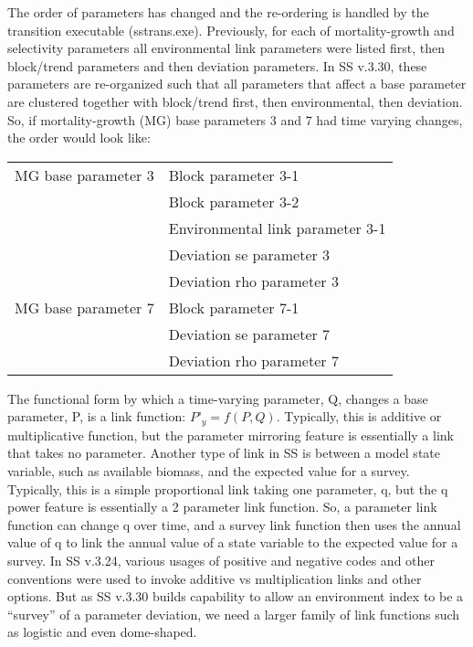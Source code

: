 The order of parameters has changed and the re-ordering is handled by the transition executable (sstrans.exe).  Previously, for each of mortality-growth and selectivity parameters all environmental link parameters were listed first, then block/trend parameters and then deviation parameters.  In SS v.3.30, these parameters are re-organized such that all parameters that affect a base parameter are clustered together with block/trend first, then environmental, then deviation.  So, if mortality-growth (MG) base parameters 3 and 7 had time varying changes, the order would look like:

\begin{center}
	\begin{longtable}{p{5cm} p{10cm}}
		\hline
		MG base parameter 3 & Block parameter 3-1\Tstrut\\
		& Block parameter 3-2\\
		& Environmental link parameter 3-1\\
		& Deviation se parameter 3 \\
		& Deviation rho parameter 3 \Bstrut\\
		MG base parameter 7 & Block parameter 7-1 \\
		& Deviation se parameter 7 \\
		& Deviation rho parameter 7 \Bstrut\\
		\hline	 	                    
		
	\end{longtable}
\end{center}

The functional form by which a time-varying parameter, Q, changes a base parameter, P, is a link function:  $P’_y=f(P,Q)$. Typically, this is additive or multiplicative function, but the parameter mirroring feature is essentially a link that takes no parameter. Another type of link in SS is between a model state variable, such as available biomass, and the expected value for a survey.  Typically, this is a simple proportional link taking one parameter, q, but the q power feature is essentially a 2 parameter link function. So, a parameter link function can change q over time, and a survey link function then uses the annual value of q to link the annual value of a state variable to the expected value for a survey.  In SS v.3.24, various usages of positive and negative codes and other conventions were used to invoke additive vs multiplication links and other options. But as SS v.3.30 builds capability to allow an environment index to be a “survey” of a parameter deviation, we need a larger family of link functions such as logistic and even dome-shaped.

